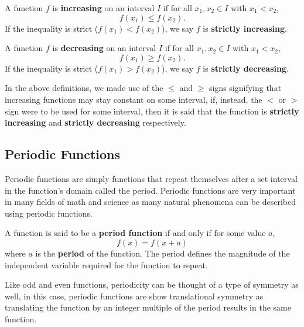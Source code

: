\begin{definition}
    A function $f$ is \textbf{increasing} on an interval $I$ if for all $x_1, x_2 \in I$ with $x_1 < x_2$,
    $$
    f(x_1) \leq f(x_2).
    $$
    If the inequality is strict ($f(x_1) < f(x_2)$), we say $f$ is \textbf{strictly increasing}.
\end{definition}

\begin{definition}
    A function $f$ is \textbf{decreasing} on an interval $I$ if for all $x_1, x_2 \in I$ with $x_1 < x_2$,
    $$
    f(x_1) \geq f(x_2).
    $$
    If the inequality is strict ($f(x_1) > f(x_2)$), we say $f$ is \textbf{strictly decreasing}.
\end{definition}

In the above definitions, we made use of the $\leq$ and $\geq$ signs signifying that increasing functions may stay constant on some interval, if, instead, the $<$ or $>$ sign were to be used for some interval, then it is said that the function is \textbf{strictly increasing} and \textbf{strictly decreasing} respectively.

\subsection{Periodic Functions}\label{sect:periodic functions}

Periodic functions are simply functions that repeat themselves after a set interval in the function's domain called the period. Periodic functions are very important in many fields of math and science as many natural phenomena can be described using periodic functions. 

\begin{definition}
    A function is said to be a \textbf{period function} if and only if for some value $a$,
    $$
    f(x) = f(x+a)
    $$
    where $a$ is the \textbf{period} of the function. The period defines the magnitude of the independent variable required for the function to repeat.
\end{definition}

Like odd and even functions, periodicity can be thought of a type of symmetry as well, in this case, periodic functions are show translational symmetry as translating the function by an integer multiple of the period results in the same function.


